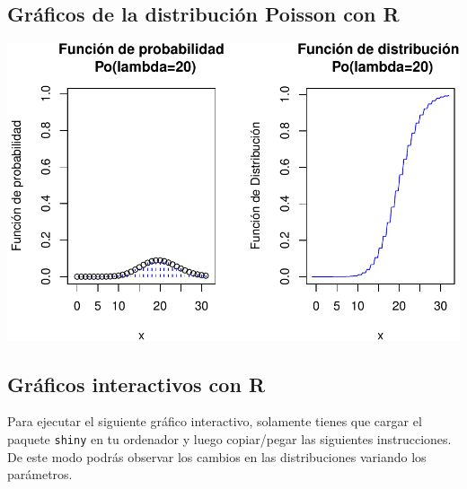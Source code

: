 \documentclass[]{book}
\begin{document}
\hypertarget{gruxe1ficos-de-la-distribuciuxf3n-poisson-con-r-1}{%
\subsection{Gráficos de la distribución Poisson con R}\label{gruxe1ficos-de-la-distribuciuxf3n-poisson-con-r-1}}

\begin{center}\includegraphics{curso-probabilidad-udemy_files/figure-latex/graficosPOISON-1} \end{center}

\hypertarget{gruxe1ficos-interactivos-con-r}{%
\subsection{Gráficos interactivos con R}\label{gruxe1ficos-interactivos-con-r}}

Para ejecutar el siguiente gráfico interactivo, solamente tienes que cargar el paquete \texttt{shiny} en tu ordenador y luego copiar/pegar las siguientes instrucciones. De este modo podrás observar los cambios en las distribuciones variando los parámetros.
\end{document}
